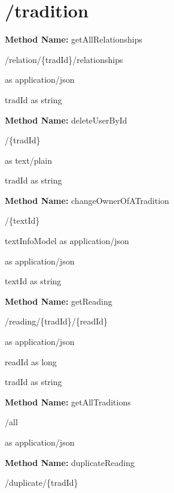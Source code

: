 \section{/tradition}
\textbf{Method Name: }getAllRelationships
\begin{get}
/relation/\{tradId\}/relationships
\end{get}
\begin{response}
 as application/json
\end{response}
\begin{parameter}
tradId as string
\end{parameter}
\textbf{Method Name: }deleteUserById
\begin{delete}
/\{tradId\}
\end{delete}
\begin{response}
 as text/plain
\end{response}
\begin{parameter}
tradId as string
\end{parameter}
\textbf{Method Name: }changeOwnerOfATradition
\begin{post}
/\{textId\}
\end{post}
\begin{request}
textInfoModel as application/json
\end{request}
\begin{response}
 as application/json
\end{response}
\begin{parameter}
textId as string
\end{parameter}
\textbf{Method Name: }getReading
\begin{get}
/reading/\{tradId\}/\{readId\}
\end{get}
\begin{response}
 as application/json
\end{response}
\begin{parameter}
readId as long
\end{parameter}
\begin{parameter}
tradId as string
\end{parameter}
\textbf{Method Name: }getAllTraditions
\begin{get}
/all
\end{get}
\begin{response}
 as application/json
\end{response}
\textbf{Method Name: }duplicateReading
\begin{post}
/duplicate/\{tradId\}
\end{post}
